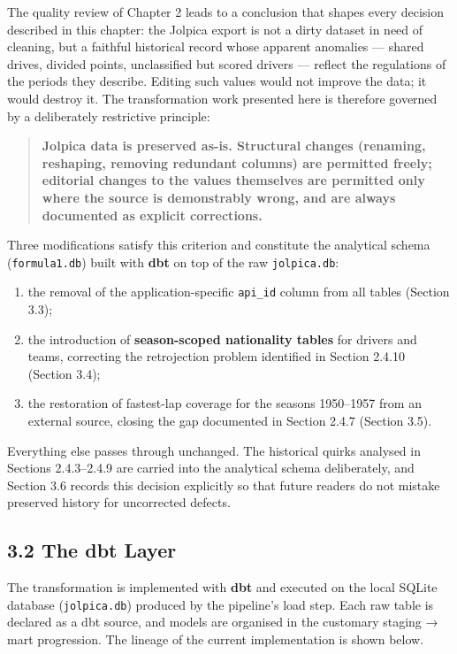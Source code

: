\documentclass[
]{article}
\providecommand{\tightlist}{%
  \setlength{\itemsep}{0pt}\setlength{\parskip}{0pt}}
\begin{document}
The quality review of Chapter 2 leads to a conclusion that shapes every
decision described in this chapter: the Jolpica export is not a dirty
dataset in need of cleaning, but a faithful historical record whose
apparent anomalies --- shared drives, divided points, unclassified but
scored drivers --- reflect the regulations of the periods they describe.
Editing such values would not improve the data; it would destroy it. The
transformation work presented here is therefore governed by a
deliberately restrictive principle:

\begin{quote}
\textbf{Jolpica data is preserved as-is. Structural changes (renaming,
reshaping, removing redundant columns) are permitted freely; editorial
changes to the values themselves are permitted only where the source is
demonstrably wrong, and are always documented as explicit corrections.}
\end{quote}

Three modifications satisfy this criterion and constitute the analytical
schema (\texttt{formula1.db}) built with \textbf{dbt} on top of the raw
\texttt{jolpica.db}:

\begin{enumerate}
\def\labelenumi{\arabic{enumi}.}
\tightlist
\item
  the removal of the application-specific \texttt{api\_id} column from
  all tables (Section 3.3);
\item
  the introduction of \textbf{season-scoped nationality tables} for
  drivers and teams, correcting the retrojection problem identified in
  Section 2.4.10 (Section 3.4);
\item
  the restoration of fastest-lap coverage for the seasons 1950--1957
  from an external source, closing the gap documented in Section 2.4.7
  (Section 3.5).
\end{enumerate}

Everything else passes through unchanged. The historical quirks analysed
in Sections 2.4.3--2.4.9 are carried into the analytical schema
deliberately, and Section 3.6 records this decision explicitly so that
future readers do not mistake preserved history for uncorrected defects.

\newpage

\subsection{3.2 The dbt Layer}\label{the-dbt-layer}

The transformation is implemented with \textbf{dbt} and executed on the
local SQLite database (\texttt{jolpica.db}) produced by the pipeline's
load step. Each raw table is declared as a dbt source, and models are
organised in the customary staging → mart progression. The lineage of
the current implementation is shown below.
\end{document}
